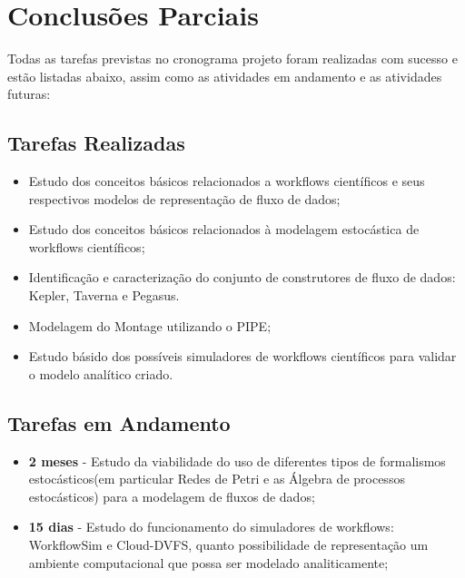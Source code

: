 \section{Conclusões Parciais}
		
	 Todas as tarefas previstas no cronograma projeto foram realizadas com sucesso e estão listadas abaixo, assim como as atividades em andamento e as atividades futuras:

\subsection{Tarefas Realizadas}

	\begin{itemize}
			\item Estudo dos conceitos básicos relacionados a workflows científicos e seus respectivos modelos de representação de fluxo de dados;
			\item Estudo dos conceitos básicos relacionados à modelagem estocástica de workflows científicos;

			\item Identificação e caracterização do conjunto de construtores de fluxo de dados: Kepler, Taverna e Pegasus.
			\item Modelagem do Montage utilizando o PIPE;
			\item Estudo básido dos possíveis simuladores de workflows científicos para validar o modelo analítico criado.
	\end{itemize}

\subsection{Tarefas em Andamento}
		\begin{itemize}
		
			\item \textbf{2 meses} - Estudo da viabilidade do uso de diferentes tipos de formalismos estocásticos(em particular Redes de Petri e as Álgebra de processos estocásticos) para a modelagem de fluxos de dados;
			
			\item \textbf{15 dias} - Estudo do funcionamento do simuladores de workflows: WorkflowSim e Cloud-DVFS, quanto possibilidade de representação um ambiente computacional que possa ser modelado analiticamente;
		\end{itemize}

